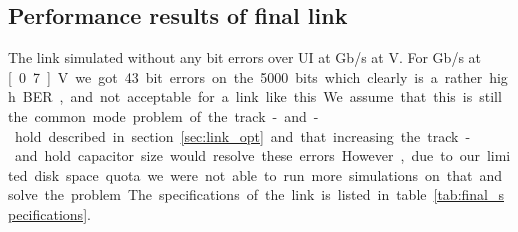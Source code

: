 \subsection{Performance results of final link}

The link simulated without any bit errors over \unit[5000]{UI} at \unit[2]{Gb/s} at \unit[1]{V}. For \unit[10]{Gb/s} at \unit[0.7]{V} we got 43 bit errors on the 5000 bits which clearly is a rather high BER, and not acceptable for a link like this. We assume that this is still the common mode problem of the track-and-hold described in section \ref{sec:link_opt} and that increasing the track-and.hold capacitor size would resolve these errors. However, due to our limited disk space quota we were not able to run more simulations on that and solve the problem.


The specifications of the link is listed in table \ref{tab:final_specifications}.


